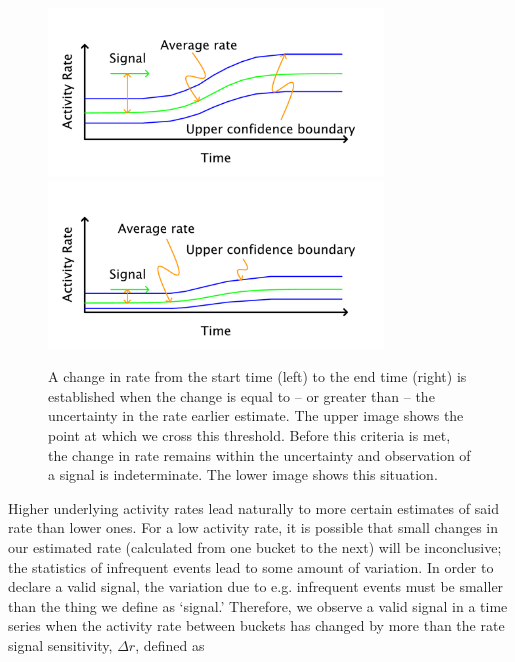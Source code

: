 \documentclass{article}
\begin{document}
%
\begin{figure}[h]
    \centering
    \includegraphics[width=3.5in]{./imgs/fig3a.pdf}
    \includegraphics[width=3.5in]{./imgs/fig3b.pdf}
        \caption{A change in rate from the start time (left) to the end time (right) is established when the 
		change is equal to -- or greater than -- the uncertainty in the rate earlier estimate. The upper 
		image shows the point at which we cross this threshold. Before this criteria is met, the 
		change in rate remains within the uncertainty and observation of a signal is 
		indeterminate. The lower image shows this situation.}
    \label{fig:signal}
\end{figure}
%
%

Higher
\reversemarginpar\marginpar{\raggedleft
%
    \begin{tikzpicture}[scale=0.26]]
\draw [red, very thick, rotate around={60: (1.5, 2.598076211353316)}] (0.8, 1.898076211353316) rectangle(2.2, 3.298076211353316);
%
\draw [very thick, <->] (0.25000000000000006, 0.4330127018922193) -- (1.25, 2.165063509461097) ;
\draw [very thick, <->] (1.75, 2.165063509461097) -- (2.75, 0.4330127018922193) ;
\draw [very thick, <->] (2.5, 0) -- (0.5, 0) ;
%
\draw [orange, ultra thick] (0,0) circle [radius= 0.5 ];
\draw [yellow, ultra thick] ( 1.5 , 2.59807621135 ) circle [radius= 0.5 ];
\draw [green,  ultra thick] ( 3.0 , 0 ) circle [radius= 0.5 ];
    \end{tikzpicture}
%
%
}
underlying activity rates lead naturally to more certain estimates of said rate than lower ones. 
For a low activity rate, it is possible that small changes in our estimated rate 
(calculated from one bucket to the next) will be inconclusive; the statistics of infrequent events 
lead to some amount of variation. In order to declare a valid signal, the variation due to e.g. 
infrequent events must be smaller than the thing we define as `signal.' Therefore, we observe
a valid signal in a time series when the activity rate between buckets has changed by 
more than the rate signal sensitivity, $\Delta r$, defined as
\end{document}
